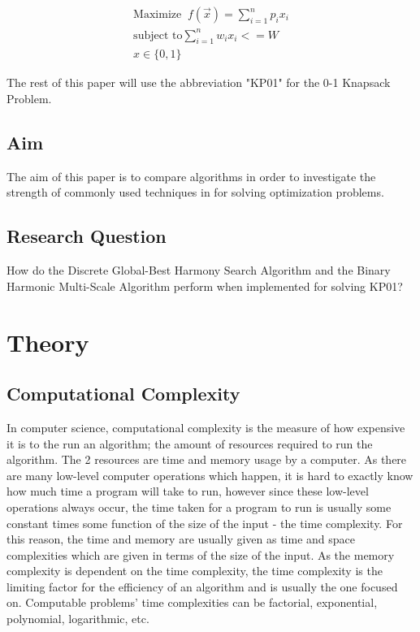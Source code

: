 \documentclass[titlepage]{article}
\begin{document}
\vskip -0.5cm

\begin{gather}
    \text{Maximize}\;\; f(\Vec{x}) = \sum_{i = 1}^{n} p_i x_i \\
    \text{subject to} \sum_{i = 1}^{n} w_i x_i <= W \\
    x \in \{0, 1\}
\end{gather}

The rest of this paper will use the abbreviation "KP01" for the 0-1 Knapsack Problem. 

\subsection{Aim}
The aim of this paper is to compare algorithms in order to investigate the strength of commonly used techniques in for solving optimization problems.

\subsection{Research Question}
How do the Discrete Global-Best Harmony Search Algorithm and the Binary Harmonic Multi-Scale Algorithm perform when implemented for solving KP01?

\newpage

\section{Theory}
\subsection{Computational Complexity}
In computer science, computational complexity is the measure of how expensive it is to the run an algorithm; the amount of resources required to run the algorithm. The 2 resources are time and memory usage by a computer. As there are many low-level computer operations which happen, it is hard to exactly know how much time a program will take to run, however since these low-level operations always occur, the time taken for a program to run is usually some constant times some function of the size of the input - the time complexity. For this reason, the time and memory are usually given as time and space complexities which are given in terms of the size of the input.  As the memory complexity is dependent on the time complexity, the time complexity is the limiting factor for the efficiency of an algorithm and is usually the one focused on. Computable problems' time complexities can be factorial, exponential, polynomial, logarithmic, etc.
\end{document}
